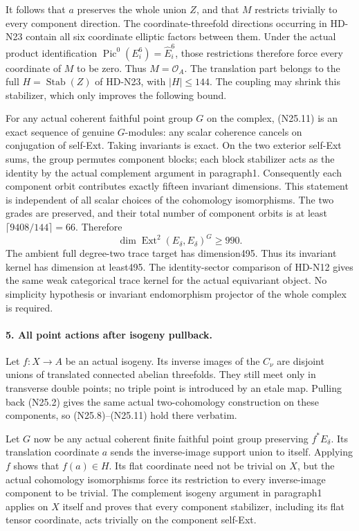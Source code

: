 It follows that $a$ preserves the whole union $Z$, and that
$M$ restricts trivially to every component direction. The
coordinate-threefold directions occurring in HD-N23 contain
all six coordinate elliptic factors between them. Under the
actual product identification
$\operatorname{Pic}^0(E_i^6)=\widehat E_i^6$, those restrictions
therefore force every coordinate of $M$ to be zero. Thus
$M=\mathcal O_A$. The translation part belongs to the full
$H=\operatorname{Stab}(Z)$ of HD-N23, with $|H|\le144$.
The coupling may shrink this stabilizer, which only improves
the following bound.

For any actual coherent faithful point group $G$ on the
complex, (N25.11) is an exact sequence of genuine $G$-modules:
any scalar coherence cancels on conjugation of self-Ext.
Taking invariants is exact. On the two exterior self-Ext sums,
the group permutes component blocks; each block stabilizer
acts as the identity by the actual complement argument in
paragraph1. Consequently each component orbit contributes
exactly fifteen invariant dimensions. This statement is
independent of all scalar choices of the cohomology
isomorphisms. The two grades are preserved, and their total
number of component orbits is at least
$\lceil9408/144\rceil=66$. Therefore
\[
         \dim\operatorname{Ext}^2(E_\delta,E_\delta)^G\ge990.
                                                               \tag{N25.13}
\]
The ambient full degree-two trace target has dimension495.
Thus its invariant kernel has dimension at least495. The
identity-sector comparison of HD-N12 gives the same weak
categorical trace kernel for the actual equivariant object.
No simplicity hypothesis or invariant endomorphism projector
of the whole complex is required.

\paragraph{5. All point actions after isogeny pullback.}
Let $f:X\to A$ be an actual isogeny. Its inverse images of
the $C_\nu$ are disjoint unions of translated connected abelian
threefolds. They still meet only in transverse double points;
no triple point is introduced by an etale map. Pulling back
(N25.2) gives the same actual two-cohomology construction on
these components, so (N25.8)--(N25.11) hold there verbatim.

Let $G$ now be any actual coherent finite faithful point group
preserving $f^*E_\delta$. Its translation coordinate $a$ sends
the inverse-image support union to itself. Applying $f$ shows
that $f(a)\in H$. Its flat coordinate need not be trivial on
$X$, but the actual cohomology isomorphisms force its restriction
to every inverse-image component to be trivial. The complement
isogeny argument in paragraph1 applies on $X$ itself and
proves that every component stabilizer, including its flat
tensor coordinate, acts trivially on the component self-Ext.

